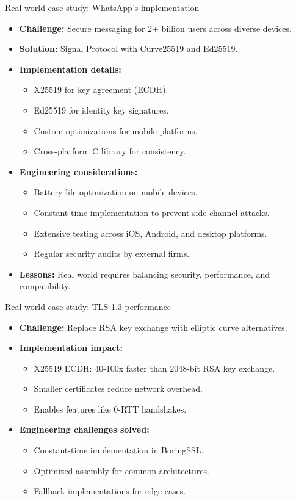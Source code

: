 \documentclass[aspectratio=169, lualatex, handout]{beamer}
\begin{document}
\begin{frame}{Real-world case study: WhatsApp's implementation}
	\begin{itemize}[<+->]
		\item \textbf{Challenge:} Secure messaging for 2+ billion users across diverse devices.
		\item \textbf{Solution:} Signal Protocol with Curve25519 and Ed25519.
		\item \textbf{Implementation details:}
		      \begin{itemize}
			      \item X25519 for key agreement (ECDH).
			      \item Ed25519 for identity key signatures.
			      \item Custom optimizations for mobile platforms.
			      \item Cross-platform C library for consistency.
		      \end{itemize}
		\item \textbf{Engineering considerations:}
		      \begin{itemize}
			      \item Battery life optimization on mobile devices.
			      \item Constant-time implementation to prevent side-channel attacks.
			      \item Extensive testing across iOS, Android, and desktop platforms.
			      \item Regular security audits by external firms.
		      \end{itemize}
		\item \textbf{Lessons:} Real world requires balancing security, performance, and compatibility.
	\end{itemize}
\end{frame}

\begin{frame}{Real-world case study: TLS 1.3 performance}
	\begin{itemize}[<+->]
		\item \textbf{Challenge:} Replace RSA key exchange with elliptic curve alternatives.
		\item \textbf{Implementation impact:}
		      \begin{itemize}
			      \item X25519 ECDH: 40-100x faster than 2048-bit RSA key exchange.
			      \item Smaller certificates reduce network overhead.
			      \item Enables features like 0-RTT handshakes.
		      \end{itemize}
		\item \textbf{Engineering challenges solved:}
		      \begin{itemize}
			      \item Constant-time implementation in BoringSSL.
			      \item Optimized assembly for common architectures.
			      \item Fallback implementations for edge cases.
		      \end{itemize}
	\end{itemize}
\end{frame}
\end{document}

